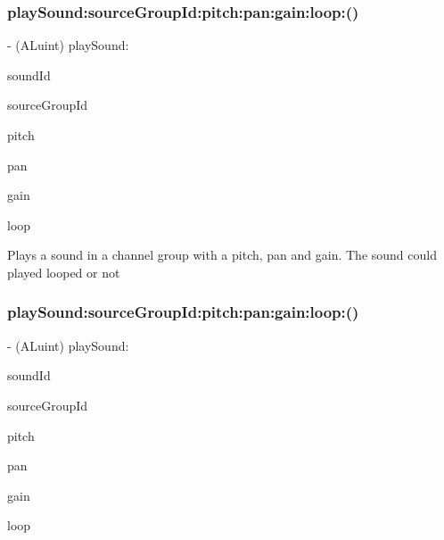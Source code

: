 \subsubsection{\texorpdfstring{play\+Sound\+:source\+Group\+Id\+:pitch\+:pan\+:gain\+:loop\+:()}{playSound:sourceGroupId:pitch:pan:gain:loop:()}\hspace{0.1cm}{\footnotesize\ttfamily [1/4]}}
{\footnotesize\ttfamily -\/ (A\+Luint) play\+Sound\+: \begin{DoxyParamCaption}\item[{(int)}]{sound\+Id }\item[{sourceGroupId:(int)}]{source\+Group\+Id }\item[{pitch:(float)}]{pitch }\item[{pan:(float)}]{pan }\item[{gain:(float)}]{gain }\item[{loop:(B\+O\+OL)}]{loop }\end{DoxyParamCaption}}

Plays a sound in a channel group with a pitch, pan and gain. The sound could played looped or not \mbox{\label{interfaceCDSoundEngine_a03aee643e250635e2594e5ced4fbe7b2}} 
\subsubsection{\texorpdfstring{play\+Sound\+:source\+Group\+Id\+:pitch\+:pan\+:gain\+:loop\+:()}{playSound:sourceGroupId:pitch:pan:gain:loop:()}\hspace{0.1cm}{\footnotesize\ttfamily [2/4]}}
{\footnotesize\ttfamily -\/ (A\+Luint) play\+Sound\+: \begin{DoxyParamCaption}\item[{(int)}]{sound\+Id }\item[{sourceGroupId:(int)}]{source\+Group\+Id }\item[{pitch:(float)}]{pitch }\item[{pan:(float)}]{pan }\item[{gain:(float)}]{gain }\item[{loop:(B\+O\+OL)}]{loop }\end{DoxyParamCaption}}

